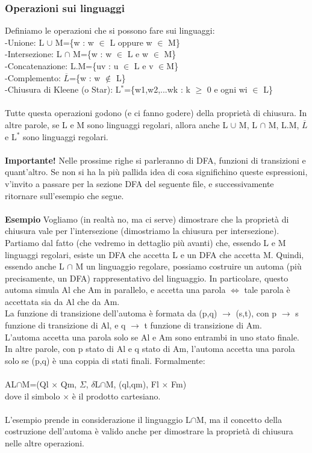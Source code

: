 \documentclass[]{article}
\begin{document}
			\subsubsection{Operazioni sui linguaggi}
				Definiamo le operazioni che si possono fare sui linguaggi: \newline \\
				-Unione: L $\cup$ M=\{w : w $\in$ L oppure w $\in$ M\}\\
				-Intersezione: L $\cap$ M=\{w : w $\in$ L e w $\in$ M\}\\
				-Concatenazione: L.M=\{uv : u $\in$ L e v $\in $M\}\\
				-Complemento: $\overline{L}$=\{w : w $\notin$ L\}\\
				-Chiusura di Kleene (o Star): L$^*$=\{w1,w2,...wk : k $\ge$ 0 e ogni wi $\in$ L\}\\\\
				Tutte questa operazioni godono (e ci fanno godere) della proprietà di chiusura. In altre parole, se L e M sono linguaggi regolari, allora anche L $\cup$ M, L $\cap$ M, L.M, $\overline{L}$ e L$^*$ sono linguaggi regolari.\\\\
				\textbf{Importante!} Nelle prossime righe si parleranno di DFA, funzioni di transizioni e quant'altro. Se non si ha la più pallida idea di cosa significhino queste espressioni, v'invito a passare per la sezione DFA del seguente file, e successivamente ritornare sull'esempio che segue.
				\\\\
				\textbf{Esempio} Vogliamo (in realtà no, ma ci serve) dimostrare che la proprietà di chiusura vale per l'intersezione (dimostriamo la chiusura per intersezione).\\
				Partiamo dal fatto (che vedremo in dettaglio più avanti) che, essendo L e M linguaggi regolari, esiste un DFA che accetta L e un DFA che accetta M. Quindi, essendo anche L $\cap$ M un linguaggio regolare, possiamo costruire un automa (più precisamente, un DFA) rappresentativo del linguaggio. In particolare, questo automa simula Al che Am in parallelo, e accetta una parola $\Leftrightarrow$ tale parola è accettata sia da Al che da Am.\\
				La funzione di transizione dell'automa è formata da (p,q) $\rightarrow$ (s,t), con p $\rightarrow$ s funzione di transizione di Al, e q $\rightarrow$ t funzione di transizione di Am.\\
				L'automa accetta una parola solo se Al e Am sono entrambi in uno stato finale. In altre parole, con p stato di Al e q stato di Am, l'automa accetta una parola solo se (p,q) è una coppia di stati finali. Formalmente:\\\\
				AL$\cap$M=(Ql $\times$ Qm, $\Sigma$, $\delta$L$\cap$M, (ql,qm), Fl $\times$ Fm)\\
				dove il simbolo $\times$ è il prodotto cartesiano.\\\\
				L'esempio prende in considerazione il linguaggio L$\cap$M, ma il concetto della costruzione dell'automa è valido anche per dimostrare la proprietà di chiusura nelle altre operazioni.
				
\end{document}
